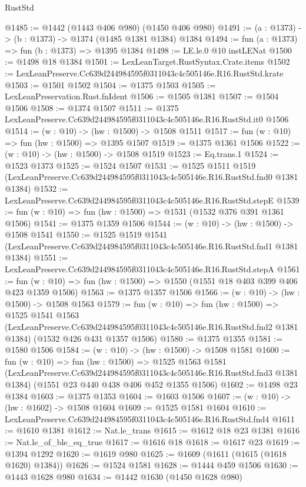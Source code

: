 \begin{lexlean}{RustStd}
\begin{coremodule}
@1485 := @1442 (@1443 @406 @980) (@1450 @406 @980)
@1491 := (a : @1373) -> (b : @1373) -> @1374 (@1485 @1381 @1384) @1384
@1494 := fun (a : @1373) => fun (b : @1373) => @1395 @1384
@1498 := LE.le.{0} @10 instLENat
@1500 := @1498 @18 @1384
@1501 := LexLeanTarget.RustSyntax.Crate.items
@1502 := LexLeanPreserve.Cc639d244984595f0311043c4c505146e.R16.RustStd.krate
@1503 := @1501 @1502
@1504 := @1375 @1503
@1505 := LexLeanPreservation.Rust.fnIdent
@1506 := @1505 @1381
@1507 := @1504 @1506
@1508 := @1374 @1507
@1511 := @1375 LexLeanPreserve.Cc639d244984595f0311043c4c505146e.R16.RustStd.it0 @1506
@1514 := (w : @10) -> (hw : @1500) -> @1508 @1511
@1517 := fun (w : @10) => fun (hw : @1500) => @1395 @1507
@1519 := @1375 @1361 @1506
@1522 := (w : @10) -> (hw : @1500) -> @1508 @1519
@1523 := Eq.trans.{1}
@1524 := @1523 @1373
@1525 := @1524 @1507
@1531 := @1525
    @1511
    @1519
    (LexLeanPreserve.Cc639d244984595f0311043c4c505146e.R16.RustStd.fnd0 @1381 @1384)
@1532 := LexLeanPreserve.Cc639d244984595f0311043c4c505146e.R16.RustStd.stepE
@1539 := fun (w : @10) => fun (hw : @1500) => @1531 (@1532 @376 @391 @1361 @1506)
@1541 := @1375 @1359 @1506
@1544 := (w : @10) -> (hw : @1500) -> @1508 @1541
@1550 := @1525
    @1519
    @1541
    (LexLeanPreserve.Cc639d244984595f0311043c4c505146e.R16.RustStd.fnd1 @1381 @1384)
@1551 := LexLeanPreserve.Cc639d244984595f0311043c4c505146e.R16.RustStd.stepA
@1561 := fun (w : @10) => fun (hw : @1500) => @1550 (@1551 @18 @403 @399 @406 @423 @1359 @1506)
@1563 := @1375 @1357 @1506
@1566 := (w : @10) -> (hw : @1500) -> @1508 @1563
@1579 := fun (w : @10) =>
  fun (hw : @1500) =>
  @1525
    @1541
    @1563
    (LexLeanPreserve.Cc639d244984595f0311043c4c505146e.R16.RustStd.fnd2 @1381 @1384)
    (@1532 @426 @431 @1357 @1506)
@1580 := @1375 @1355
@1581 := @1580 @1506
@1584 := (w : @10) -> (hw : @1500) -> @1508 @1581
@1600 := fun (w : @10) =>
  fun (hw : @1500) =>
  @1525
    @1563
    @1581
    (LexLeanPreserve.Cc639d244984595f0311043c4c505146e.R16.RustStd.fnd3 @1381 @1384)
    (@1551 @23 @440 @438 @406 @452 @1355 @1506)
@1602 := @1498 @23 @1384
@1603 := @1375 @1353
@1604 := @1603 @1506
@1607 := (w : @10) -> (hw : @1602) -> @1508 @1604
@1609 := @1525 @1581 @1604
@1610 := LexLeanPreserve.Cc639d244984595f0311043c4c505146e.R16.RustStd.fnd4
@1611 := @1610 @1381
@1612 := Nat.le_trans
@1615 := @1612 @18 @23 @1381
@1616 := Nat.le_of_ble_eq_true
@1617 := @1616 @18
@1618 := @1617 @23
@1619 := @1394 @1292
@1620 := @1619 @980
@1625 := @1609 (@1611 (@1615 (@1618 @1620) @1384))
@1626 := @1524 @1581
@1628 := @1444 @459 @1506
@1630 := @1443 @1628 @980
@1634 := @1442 @1630 (@1450 @1628 @980)

\end{coremodule}
\end{lexlean}
